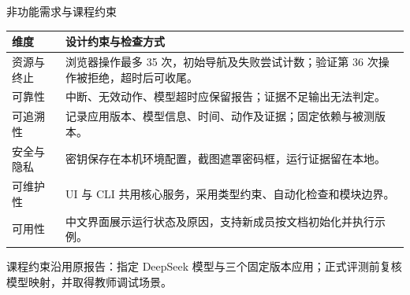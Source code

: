 \begin{frame}{非功能需求与课程约束}
\small
\begin{tabularx}{\textwidth}{lX}
\toprule
维度 & 设计约束与检查方式 \\
\midrule
资源与终止 & 浏览器操作最多 35 次，初始导航及失败尝试计数；验证第 36 次操作被拒绝，超时后可收尾。\\
可靠性 & 中断、无效动作、模型超时应保留报告；证据不足输出无法判定。\\
可追溯性 & 记录应用版本、模型信息、时间、动作及证据；固定依赖与被测版本。\\
安全与隐私 & 密钥保存在本机环境配置，截图遮罩密码框，运行证据留在本地。\\
可维护性 & UI 与 CLI 共用核心服务，采用类型约束、自动化检查和模块边界。\\
可用性 & 中文界面展示运行状态及原因，支持新成员按文档初始化并执行示例。\\
\bottomrule
\end{tabularx}
\vfill
\footnotesize 课程约束沿用原报告：指定 DeepSeek 模型与三个固定版本应用；正式评测前复核模型映射，并取得教师调试场景。
\end{frame}
